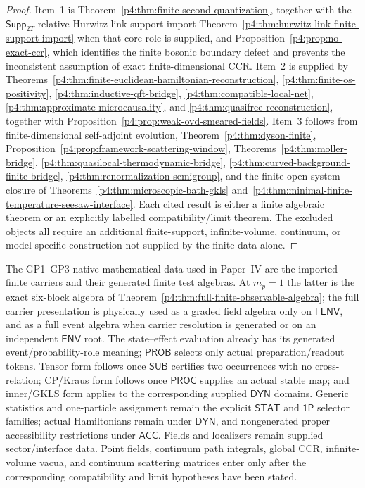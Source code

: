 \documentclass[12pt,a4paper]{article}
\begin{document}
\begin{proof}
Item~1 is Theorem~\ref{p4:thm:finite-second-quantization}, together with the
\(\mathsf{Supp}_{2T}\)-relative Hurwitz-link support import
Theorem~\ref{p4:thm:hurwitz-link-finite-support-import} when that core role is
supplied, and Proposition~\ref{p4:prop:no-exact-ccr}, which
identifies the finite bosonic boundary defect and prevents the inconsistent
assumption of exact finite-dimensional CCR.  Item~2 is supplied by
Theorems~\ref{p4:thm:finite-euclidean-hamiltonian-reconstruction},
\ref{p4:thm:finite-os-positivity}, \ref{p4:thm:inductive-qft-bridge},
\ref{p4:thm:compatible-local-net}, \ref{p4:thm:approximate-microcausality},
and \ref{p4:thm:quasifree-reconstruction}, together with
Proposition~\ref{p4:prop:weak-ovd-smeared-fields}.  Item~3 follows from
finite-dimensional self-adjoint evolution, Theorem~\ref{p4:thm:dyson-finite},
Proposition~\ref{p4:prop:framework-scattering-window},
Theorems~\ref{p4:thm:moller-bridge},
\ref{p4:thm:quasilocal-thermodynamic-bridge},
\ref{p4:thm:curved-background-finite-bridge},
\ref{p4:thm:renormalization-semigroup}, and the finite open-system closure of
Theorems~\ref{p4:thm:microscopic-bath-gkls}
and~\ref{p4:thm:minimal-finite-temperature-seesaw-interface}.  Each cited
result is either a finite algebraic theorem or an explicitly labelled
compatibility/limit theorem.  The excluded objects all require an additional
finite-support, infinite-volume, continuum, or model-specific construction
not supplied by the finite data alone.
\end{proof}


\begin{remark}
\label{p4:rem:qft-postulate-boundary}
The GP1--GP3-native mathematical data used in Paper~IV are the imported
finite carriers and their generated finite test algebras.  At \(m_p=1\) the
latter is the exact six-block algebra of
Theorem~\ref{p4:thm:full-finite-observable-algebra}; the full carrier
presentation is physically used as a graded field algebra only on
\(\mathsf{FENV}\), and as a full event algebra when carrier resolution is
generated or on an independent \(\mathsf{ENV}\) root.  The state--effect
evaluation already has its generated event/probability-role meaning;
\(\mathsf{PROB}\) selects only actual preparation/readout tokens.  Tensor form follows once \(\mathsf{SUB}\)
certifies two occurrences with no cross-relation; CP/Kraus form follows once
\(\mathsf{PROC}\) supplies an actual stable map; and inner/GKLS form applies
to the corresponding supplied \(\mathsf{DYN}\) domains.
Generic statistics and one-particle assignment remain the explicit
\(\mathsf{STAT}\) and \(\mathsf{1P}\) selector families; actual Hamiltonians
remain under \(\mathsf{DYN}\), and nongenerated proper accessibility
restrictions under \(\mathsf{ACC}\).  Fields and localizers remain supplied
sector/interface data.  Point fields, continuum path
integrals, global CCR, infinite-volume vacua, and continuum scattering
matrices enter only after the corresponding compatibility and limit
hypotheses have been stated.
\end{remark}
\end{document}
